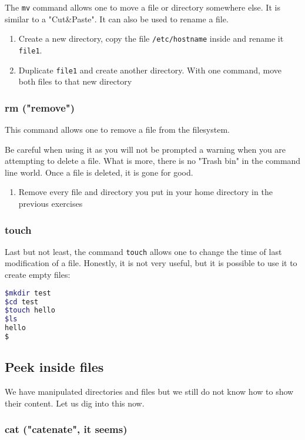 \documentclass[12pt]{article}
\begin{document}
The \texttt{mv} command allows one to move a file or directory somewhere else. It is similar to a "Cut\&Paste".
It can also be used to rename a file.

\begin{enumerate}
\item Create a new directory, copy the file \texttt{/etc/hostname} inside and rename it \texttt{file1}.
\item Duplicate \texttt{file1} and create another directory. With one command, move both files to that new directory
\end{enumerate}

\subsubsection{rm ("remove")}

This command allows one to remove a file from the filesystem.

Be careful when using it as you will not be prompted a warning when you are attempting to delete a file. What is more, there is no "Trash bin" in the command line world. Once a file is deleted, it is gone for good.

\begin{enumerate}
\item Remove every file and directory you put in your home directory in the previous exercises
\end{enumerate}

\subsubsection{touch}

Last but not least, the command \texttt{touch} allows one to change the time of last modification of a file. Honestly, it is not very useful, but it is possible to use it to create empty files:

\begin{lstlisting}[language=bash]
$mkdir test
$cd test
$touch hello
$ls
hello
$
\end{lstlisting}


\subsection{Peek inside files}

We have manipulated directories and files but we still do not know how to show their content. Let us dig into this now.

\subsubsection{cat ("catenate", it seems)}
\end{document}
